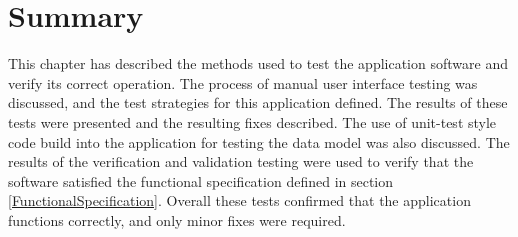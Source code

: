 
\section{Summary}

This chapter has described the methods used to test the application software and verify its correct operation. The process of manual user interface testing was discussed, and the test strategies for this application defined. The results of these tests were presented and the resulting fixes described. The use of unit-test style code build into the application for testing the data model was also discussed. The results of the verification and validation testing were used to verify that the software satisfied the functional specification defined in section \ref{FunctionalSpecification}. Overall these tests confirmed that the application functions correctly, and only minor fixes were required.